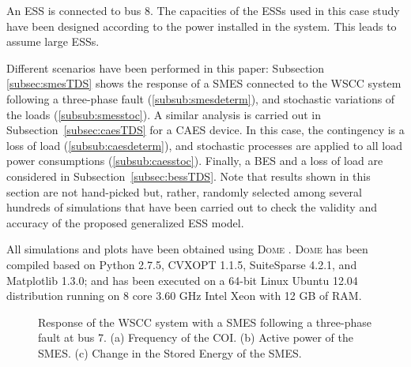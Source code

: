 \documentclass[journal, a4paper]{IEEEtran}
\begin{document}
An ESS is connected to bus 8.  The capacities of the ESSs used in this
case study have been designed according to the power installed in the
system.  This leads to assume large ESSs. 



Different scenarios have been performed in this paper: Subsection
\ref{subsec:smesTDS} shows the response of a SMES connected to the
WSCC system following a three-phase fault (\ref{subsub:smesdeterm}), 
and stochastic variations of the loads (\ref{subsub:smesstoc}).
A similar analysis is carried out in Subsection~\ref{subsec:caesTDS} for a CAES device.
In this case, the contingency is a loss of load (\ref{subsub:caesdeterm}),
and stochastic processes are applied to all load power consumptions (\ref{subsub:caesstoc}).
Finally, a BES and a loss of load are considered in Subsection~\ref{subsec:bessTDS}.
Note that results shown in this section are not hand-picked but, rather, randomly
selected among several hundreds of simulations that have been carried out to check
the validity and accuracy of the proposed generalized ESS model.

All simulations and plots have been obtained using \textsc{Dome}
\cite{Vancouver}.  \textsc{Dome} has been compiled based on Python
2.7.5, CVXOPT 1.1.5, SuiteSparse 4.2.1, and Matplotlib 1.3.0; and has
been executed on a 64-bit Linux Ubuntu 12.04 distribution running on 8
core 3.60 GHz Intel Xeon with 12 GB of RAM.

\vspace{-2mm}


\begin{figure}[t!]
  \centering
  \vspace{-2.5mm}
  \caption{Response of the WSCC system with a SMES following a three-phase
    fault at bus 7.  (a) Frequency of the COI.  (b) Active power
    of the SMES. (c) Change in the Stored Energy of the SMES.}
  	\label{SMES_noSat}
\vspace{-0.4cm}
\end{figure}
\end{document}
